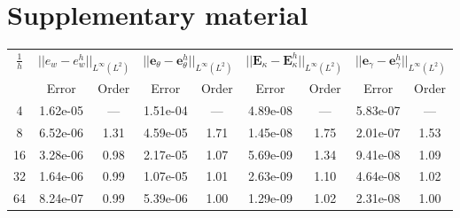 \chapter{Supplementary material}

\begin{table}[hp]
	\centering
	\begin{tabular}{ccccccccc}
		\hline 
		\multirow{2}{*}{$\frac{1}{h}$} & \multicolumn{2}{c}{$||e_w - e_w^h||_{L^{\infty}(L^2)}$}    & \multicolumn{2}{c}{$||\bm{e}_\theta - \bm{e}_\theta^h||_{L^{\infty}(L^2)}$} & \multicolumn{2}{c}{$||\bm{E}_\kappa - \bm{E}_\kappa^h||_{L^{\infty}(L^2)}$} & \multicolumn{2}{c}{$||\bm{e}_\gamma - \bm{e}_\gamma^ h||_{L^{\infty}(L^2)}$}   \\ 
		& Error & Order  & Error & Order  & Error & Order  & Error & Order   \\ 
		\hline 
		4  & 1.62e-05 & ---  & 1.51e-04 & ---  & 4.89e-08 & ---  & 5.83e-07 & --- \\ 
		8  & 6.52e-06 & 1.31 & 4.59e-05 & 1.71 & 1.45e-08 & 1.75 & 2.01e-07 & 1.53\\ 
		16 & 3.28e-06 & 0.98 & 2.17e-05 & 1.07 & 5.69e-09 & 1.34 & 9.41e-08 & 1.09\\ 
		32 & 1.64e-06 & 0.99 & 1.07e-05 & 1.01 & 2.63e-09 & 1.10 & 4.64e-08 & 1.02\\ 
		64 & 8.24e-07 & 0.99 & 5.39e-06 & 1.00 & 1.29e-09 & 1.02 & 2.31e-08 & 1.00\\ 
		\hline 
	\end{tabular} 
	\captionsetup{width=0.95\linewidth}
	\vspace{1mm}
	\label{tab:resminBTJ_k1}
\end{table}

